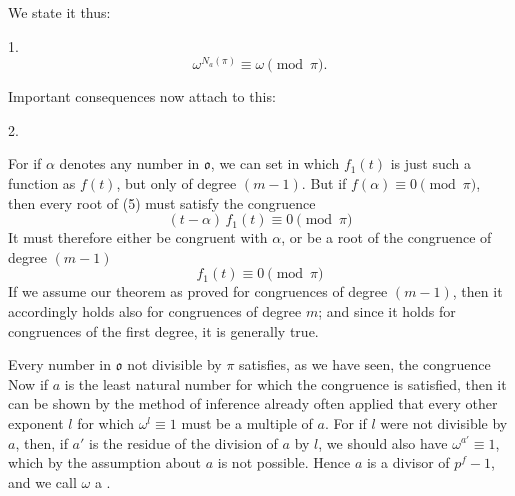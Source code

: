 We state it thus:

1. 
\[ \omega^{N_a(\pi)} \equiv \omega \pmod{\pi}. \]

Important consequences now attach to this:

2. 

For if $\alpha$ denotes any number in $\mathfrak{o}$, we can set
in which $f_1(t)$ is just such a function as $f(t)$, but only of degree $(m-1)$. But if $f(\alpha) \equiv 0 \pmod{\pi}$, then every root of (5) must satisfy the congruence
\[ (t-\alpha)\,f_1(t) \equiv 0 \pmod{\pi} \]
It must therefore either be congruent with $\alpha$, or be a root of the congruence of degree $(m-1)$
\[ f_1(t) \equiv 0 \pmod{\pi} \]
If we assume our theorem as proved for congruences of degree $(m-1)$, then it accordingly holds also for congruences of degree $m$; and since it holds for congruences of the first degree, it is generally true.

Every number in $\mathfrak{o}$ not divisible by $\pi$ satisfies, as we have seen, the congruence
Now if $a$ is the least natural number for which the congruence
is satisfied, then it can be shown by the method of inference already often applied that every other exponent $l$ for which $\omega^l \equiv 1$ must be a multiple of $a$. For if $l$ were not divisible by $a$, then, if $a'$ is the residue of the division of $a$ by $l$, we should also have $\omega^{a'} \equiv 1$, which by the assumption about $a$ is not possible. %
Hence $a$ is a divisor of $p^f-1$, and we call $\omega$ a .

